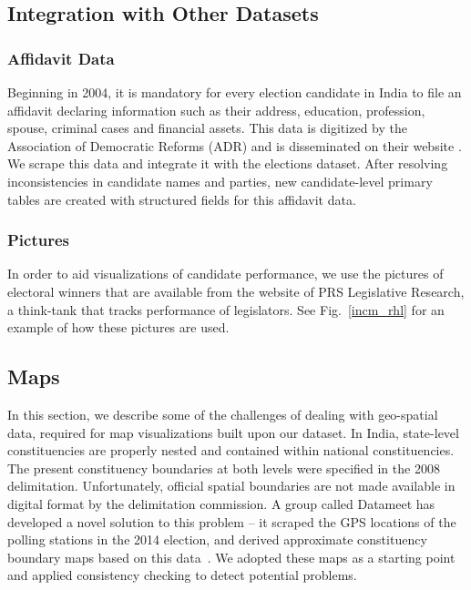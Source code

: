 \subsection{Integration with Other Datasets}


\subsubsection{Affidavit Data}
Beginning in 2004, it is mandatory for every election candidate in India to file an affidavit declaring information such as their address, education, profession, spouse, criminal cases and financial assets. This data is digitized by the Association of Democratic Reforms (ADR) and is disseminated on their website \cite{myneta}. We scrape this data and integrate it with the elections dataset. After resolving inconsistencies in candidate names and parties, new candidate-level primary tables are created with structured fields for this affidavit data.

\subsubsection{Pictures}
In order to aid visualizations of candidate performance, we use the pictures of electoral winners that are available from the website of PRS Legislative Research, a think-tank that tracks performance of legislators. See Fig.~\ref{incm_rhl} for an example of how these pictures are used. 

\subsection{Maps}

In this section, we describe some of the challenges of dealing with geo-spatial data, required for map visualizations built upon our dataset. In India, state-level constituencies are properly nested and contained within national constituencies. The present constituency boundaries at both levels were specified in the 2008 delimitation. Unfortunately, official spatial boundaries are not made available in digital format by the delimitation commission. A group called Datameet has developed a novel solution to this problem -- it scraped the GPS locations of the polling stations in the 2014 election, and derived approximate constituency boundary maps based on this data~\cite{datameet}. We adopted these maps as a starting point and applied consistency checking to detect potential problems. 

